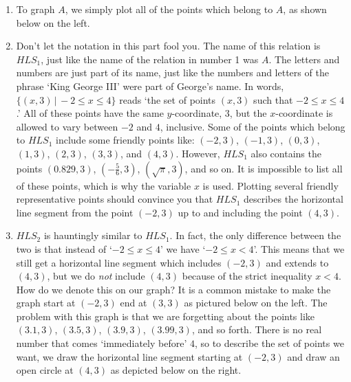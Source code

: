 {
\begin{enumerate}

\item  To graph $A$, we simply plot all of the points which belong to $A$, as shown below on the left.

\item  Don't let the notation in this part fool you.  The name of this relation is $HLS_{1}$, just like the name of the relation in number 1 was $A$.  The letters and numbers are just part of its name, just like the numbers and letters of the phrase `King George III' were part of George's name.  In words,  $\{ (x,3)\, | \, -2 \leq x \leq 4 \}$  reads `the set of points $(x,3)$ such that $-2 \leq x \leq 4$.'   All of these points have the same $y$-coordinate, $3$, but the $x$-coordinate is allowed to vary between $-2$ and $4$, inclusive.  Some of the points which belong to $HLS_{1}$ include some friendly points like:  $(-2,3)$, $(-1,3)$, $(0,3)$, $(1,3)$, $(2,3)$, $(3,3)$, and $(4,3)$.  However, $HLS_{1}$ also contains the points $(0.829, 3)$, $\left(-\frac{5}{6}, 3\right)$, $( \sqrt{\pi}, 3)$, and so on.  It is impossible to list all of these points, which is why the variable $x$ is used.  Plotting several friendly representative points should convince you that $HLS_{1}$ describes the horizontal line segment from the point $(-2,3)$ up to and including the point $(4,3)$.




\item  $HLS_{2}$ is hauntingly similar to $HLS_{1}$.  In fact, the only difference between the two is that instead of `$-2 \leq x \leq 4$' we have `$-2 \leq x < 4$'. This means that we still get a horizontal line segment which includes $(-2,3)$ and extends to $(4,3)$, but we do \emph{not} include $(4,3)$ because of the strict inequality $x < 4$.   How do we denote this on our graph?  It is a common mistake to make the graph start at $(-2,3)$ end at $(3,3)$ as pictured below on the left.  The problem with this graph is that we are forgetting about the points like $(3.1, 3)$, $(3.5, 3)$, $(3.9, 3)$, $(3.99, 3)$, and so forth.  There is no real number that comes `immediately before' $4$, so to describe the set of points we want, we draw the horizontal line segment starting at $(-2,3)$ and draw an open circle at $(4,3)$ as depicted below on the right.


\end{enumerate}}
